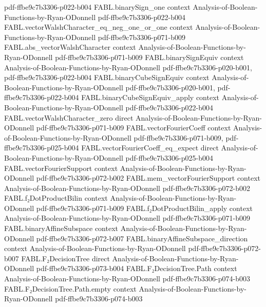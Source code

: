 \begin{theorem}
  {pdf-ffbe9c7b3306-p022-b004}
\proofstep
  {FABL.binarySign_one}
  {context}
  {Analysis-of-Boolean-Functions-by-Ryan-ODonnell}
  {pdf-ffbe9c7b3306-p022-b004}
\proofstep
  {FABL.vectorWalshCharacter_eq_neg_one_or_one}
  {context}
  {Analysis-of-Boolean-Functions-by-Ryan-ODonnell}
  {pdf-ffbe9c7b3306-p071-b009}
\proofstep
  {FABL.abs_vectorWalshCharacter}
  {context}
  {Analysis-of-Boolean-Functions-by-Ryan-ODonnell}
  {pdf-ffbe9c7b3306-p071-b009}
\proofstep
  {FABL.binarySignEquiv}
  {context}
  {Analysis-of-Boolean-Functions-by-Ryan-ODonnell}
  {pdf-ffbe9c7b3306-p020-b001,
    pdf-ffbe9c7b3306-p022-b004}
\proofstep
  {FABL.binaryCubeSignEquiv}
  {context}
  {Analysis-of-Boolean-Functions-by-Ryan-ODonnell}
  {pdf-ffbe9c7b3306-p020-b001,
    pdf-ffbe9c7b3306-p022-b004}
\proofstep
  {FABL.binaryCubeSignEquiv_apply}
  {context}
  {Analysis-of-Boolean-Functions-by-Ryan-ODonnell}
  {pdf-ffbe9c7b3306-p022-b004}
\proofstep
  {FABL.vectorWalshCharacter_zero}
  {direct}
  {Analysis-of-Boolean-Functions-by-Ryan-ODonnell}
  {pdf-ffbe9c7b3306-p071-b009}
\proofstep
  {FABL.vectorFourierCoeff}
  {context}
  {Analysis-of-Boolean-Functions-by-Ryan-ODonnell}
  {pdf-ffbe9c7b3306-p071-b009,
    pdf-ffbe9c7b3306-p025-b004}
\proofstep
  {FABL.vectorFourierCoeff_eq_expect}
  {direct}
  {Analysis-of-Boolean-Functions-by-Ryan-ODonnell}
  {pdf-ffbe9c7b3306-p025-b004}
\proofstep
  {FABL.vectorFourierSupport}
  {context}
  {Analysis-of-Boolean-Functions-by-Ryan-ODonnell}
  {pdf-ffbe9c7b3306-p072-b002}
\proofstep
  {FABL.mem_vectorFourierSupport}
  {context}
  {Analysis-of-Boolean-Functions-by-Ryan-ODonnell}
  {pdf-ffbe9c7b3306-p072-b002}
\proofstep
  {FABL.f₂DotProductBilin}
  {context}
  {Analysis-of-Boolean-Functions-by-Ryan-ODonnell}
  {pdf-ffbe9c7b3306-p071-b009}
\proofstep
  {FABL.f₂DotProductBilin_apply}
  {context}
  {Analysis-of-Boolean-Functions-by-Ryan-ODonnell}
  {pdf-ffbe9c7b3306-p071-b009}
\proofstep
  {FABL.binaryAffineSubspace}
  {context}
  {Analysis-of-Boolean-Functions-by-Ryan-ODonnell}
  {pdf-ffbe9c7b3306-p072-b007}
\proofstep
  {FABL.binaryAffineSubspace_direction}
  {context}
  {Analysis-of-Boolean-Functions-by-Ryan-ODonnell}
  {pdf-ffbe9c7b3306-p072-b007}
\proofstep
  {FABL.F₂DecisionTree}
  {direct}
  {Analysis-of-Boolean-Functions-by-Ryan-ODonnell}
  {pdf-ffbe9c7b3306-p073-b004}
\proofstep
  {FABL.F₂DecisionTree.Path}
  {context}
  {Analysis-of-Boolean-Functions-by-Ryan-ODonnell}
  {pdf-ffbe9c7b3306-p074-b003}
\proofstep
  {FABL.F₂DecisionTree.Path.empty}
  {context}
  {Analysis-of-Boolean-Functions-by-Ryan-ODonnell}
  {pdf-ffbe9c7b3306-p074-b003}
\proofstep

\end{theorem}
